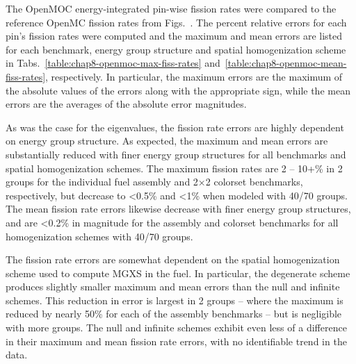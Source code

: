The OpenMOC energy-integrated pin-wise fission rates were compared to the reference OpenMC fission rates from Figs.~. The percent relative errors for each pin's fission rates were computed and the maximum and mean errors are listed for each benchmark, energy group structure and spatial homogenization scheme in Tabs.~\ref{table:chap8-openmoc-max-fiss-rates} and~\ref{table:chap8-openmoc-mean-fiss-rates}, respectively. In particular, the maximum errors are the maximum of the absolute values of the errors along with the appropriate sign, while the mean errors are the averages of the absolute error magnitudes.

As was the case for the eigenvalues, the fission rate errors are highly dependent on energy group structure. As expected, the maximum and mean errors are substantially reduced with finer energy group structures for all benchmarks and spatial homogenization schemes. The maximum fission rates are 2 -- 10+\% in 2 groups for the individual fuel assembly and 2$\times$2 colorset benchmarks, respectively, but decrease to <0.5\% and <1\% when modeled with 40/70 groups. The mean fission rate errors likewise decrease with finer energy group structures, and are <0.2\% in magnitude for the assembly and colorset benchmarks for all homogenization schemes with 40/70 groups.

The fission rate errors are somewhat dependent on the spatial homogenization scheme used to compute \ac{MGXS} in the fuel. In particular, the degenerate scheme produces slightly smaller maximum and mean errors than the null and infinite schemes. This reduction in error is largest in 2 groups -- where the maximum is reduced by nearly 50\% for each of the assembly benchmarks -- but is negligible with more groups. The null and infinite schemes exhibit even less of a difference in their maximum and mean fission rate errors, with no identifiable trend in the data.

